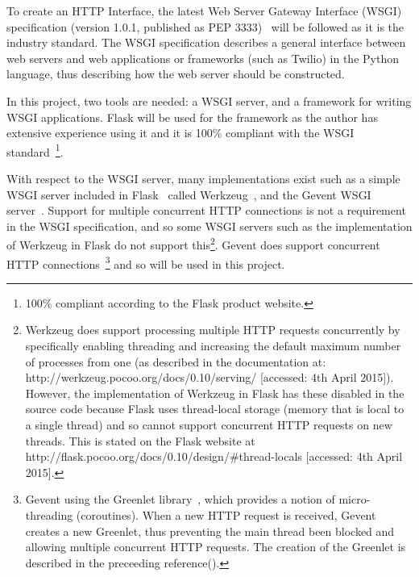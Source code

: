 \documentclass[authoryearcitations]{UoYCSproject}
\begin{document}
To create an HTTP Interface, the latest Web Server Gateway Interface (WSGI) specification (version 1.0.1, published as PEP 3333)~\cite{eby2010python} will be followed as it is the industry standard. The WSGI specification describes a general interface between web servers and web applications or frameworks (such as Twilio) in the Python language, thus describing how the web server should be constructed.

In this project, two tools are needed: a WSGI server, and a framework for writing WSGI applications. Flask will be used for the framework as the author has extensive experience using it and it is 100\% compliant with the WSGI standard~\cite{libraryFlask}\footnote{100\% compliant according to the Flask product website.}.

With respect to the WSGI server, many implementations exist such as a simple WSGI server included in Flask~\cite{libraryFlask} called Werkzeug~\cite{libraryWerkzeug}, and the Gevent WSGI server~\cite{libraryGevent}.  Support for multiple concurrent HTTP connections is not a requirement in the WSGI specification, and so some WSGI servers such as the implementation of Werkzeug in Flask do not support this\footnote{Werkzeug does support processing multiple HTTP requests concurrently by specifically enabling threading and increasing the default maximum number of processes from one (as described in the documentation at: http://werkzeug.pocoo.org/docs/0.10/serving/ [accessed: 4th April 2015]). However, the implementation of Werkzeug in Flask has these disabled in the source code because Flask uses thread-local storage (memory that is local to a single thread) and so cannot support concurrent HTTP requests on new threads. This is stated on the Flask website at http://flask.pocoo.org/docs/0.10/design/\#thread-locals [accessed: 4th April 2015].}. Gevent does support concurrent HTTP connections~\cite{geventImplementingServers}\footnote{Gevent using the Greenlet library~\cite{libraryGreenlet}, which provides a notion of micro-threading (coroutines). When a new HTTP request is received, Gevent creates a new Greenlet, thus preventing the main thread been blocked and allowing multiple concurrent HTTP requests. The creation of the Greenlet is described in the preceeding reference(\cite{geventImplementingServers}).} and so will be used in this project.

\end{document}
